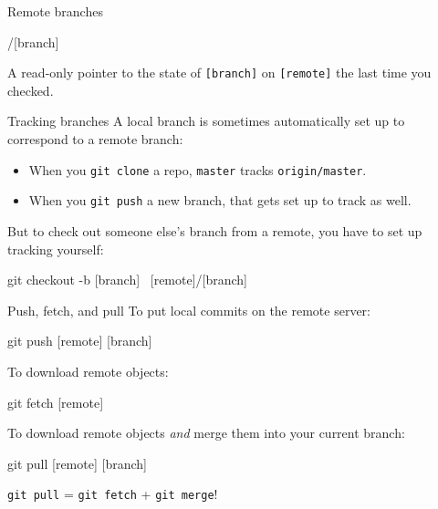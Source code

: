 \begin{frame}[fragile]{Remote branches}
  \begin{gitCommand}[remote]/[branch]\end{gitCommand}

  A read-only pointer to the state of \texttt{[branch]} on \texttt{[remote]}
  the last time you checked.
\end{frame}

\begin{frame}[fragile]{Tracking branches}
  A local branch is sometimes automatically set up to correspond to a remote
  branch:

  \begin{itemize}
    \item When you \texttt{git clone} a repo, \texttt{master} tracks
    \texttt{origin/master}.

    \item When you \texttt{git push} a new branch, that gets set up to track
    as well.
  \end{itemize}

  But to check out someone else's branch from a remote, you have to set up tracking
  yourself:

  \begin{gitCommand}git checkout -b [branch] \
  [remote]/[branch]\end{gitCommand}
\end{frame}

\begin{frame}[fragile]{Push, fetch, and pull}
  To put local commits on the remote server:

  \begin{gitCommand}git push [remote] [branch]\end{gitCommand}

  To download remote objects:

  \begin{gitCommand}git fetch [remote]\end{gitCommand}

  To download remote objects \emph{and} merge them into your current branch:

  \begin{gitCommand}git pull [remote] [branch]\end{gitCommand}

  \texttt{git pull} = \texttt{git fetch} + \texttt{git merge}!
\end{frame}

